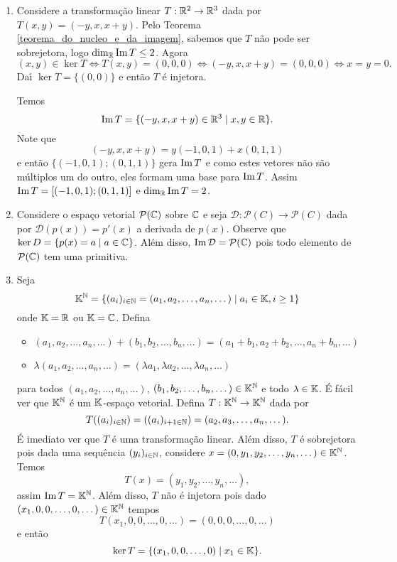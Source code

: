 \begin{exemplos}
	\begin{enumerate}
		\item Considere a transforma\c{c}\~ao linear $T : \mathbb{R}^2 \to \mathbb{R}^3$ dada por $T(x,y) = (-y, x, x+y)$. Pelo Teorema \ref{teorema_do_nucleo_e_da_imagem}, sabemos que $T$ n\~ao pode ser sobrejetora, logo $\dim_{\mathbb{R}}{\rm Im\,} T \le 2$. Agora
		\[
			(x,y) \in \ker T \Leftrightarrow T(x,y) = (0,0,0) \Leftrightarrow (-y,x,x+y) = (0,0,0) \Leftrightarrow x = y = 0.
		\]
		Da{\'\i} $\ker T = \{(0,0)\}$ e ent\~ao $T$ \'e injetora.

		Temos
		\[
			{\rm Im\,} T = \{(-y,x,x+y) \in \mathbb{R}^3 \mid x, y \in \mathbb{R}\}.
		\]
		Note que
		\[
			(-y,x,x+y) = y(-1,0,1) + x(0,1,1)
		\]
		e ent\~ao $\{(-1,0,1);(0,1,1)\}$ gera ${\rm Im\,} T$ e como estes vetores n\~ao s\~ao m\'ultiplos um do outro, eles formam uma base para ${\rm Im\,} T$. Assim ${\rm Im\,} T = [(-1,0,1);(0,1,1)]$ e $\dim_{\mathbb{R}}{\rm Im\,} T = 2$.

		\item Considere o espa\c{c}o vetorial $\mathcal{P}(\mathbb{C})$ sobre $\mathbb{C}$ e seja $\mathcal{D} : \mathcal{P}(C) \to \mathcal{P}(C)$ dada por $\mathcal{D}(p(x)) = p'(x)$ a derivada de $p(x)$. Observe que $\ker D = \{p(x) = a \mid a \in \mathbb{C}\}$. Al\'em disso, ${\rm Im\,} \mathcal{D} = \mathcal{P}(\mathbb{C})$ pois todo elemento de $\mathcal{P}(\mathbb{C})$ tem uma primitiva.

		\item Seja
		\[
			\mathbb{K}^{\mathbb{N}} = \{(a_i)_{i \in \mathbb{N}} = (a_1, a_2, \dots, a_n, \dots) \mid a_i \in \mathbb{K}, i \ge 1\}
		\]
		onde $\mathbb{K} = \mathbb{R}$ ou $\mathbb{K} = \mathbb{C}$. Defina
		\begin{itemize}
			\item $(a_1,a_2,\dots,a_n,\dots) + (b_1,b_2,\dots,b_n,\dots) = (a_1+b_1,a_2+b_2,\dots,a_n+b_n,\dots)$

			\item $\lambda(a_1,a_2,\dots,a_n,\dots) = (\lambda a_1,\lambda a_2,\dots,\lambda a_n,\dots)$
		\end{itemize}
		para todos $(a_1,a_2,\dots,a_n,\dots)$, $(b_1,b_2,\dots,b_n,\dots) \in \mathbb{K}^{\mathbb{N}}$ e todo $\lambda \in \mathbb{K}$. \'E f\'acil ver que $\mathbb{K}^{\mathbb{N}}$ \'e um $\mathbb{K}$-espa\c{c}o vetorial. Defina $T : \mathbb{K}^{\mathbb{N}} \to \mathbb{K}^{\mathbb{N}}$ dada por
		\[
			T((a_i)_{i\in\mathbb{N}}) = ((a_i)_{i+1\in\mathbb{N}}) = (a_2,a_3,\dots,a_n,\dots).
		\]
		\'E imediato ver que $T$ \'e uma transforma\c{c}\~ao linear. Al\'em disso, $T$ \'e sobrejetora pois dada uma sequ\^encia $(y_i)_{i\in\mathbb{N}}$, considere $x = (0,y_1,y_2,\dots,y_n,\dots) \in \mathbb{K}^{\mathbb{N}}$. Temos
		\[
			T(x) = (y_1,y_2,\dots,y_n,\dots),
		\]
		assim ${\rm Im\,} T = \mathbb{K}^{\mathbb{N}}$. Al\'em disso, $T$ n\~ao \'e injetora pois dado $(x_1,0,0,\dots,0,\dots) \in \mathbb{K}^{\mathbb{N}}$ tempos
		\[
			T(x_1,0,0,\dots,0,\dots) = (0,0,0,\dots,0,\dots)
		\]
		e ent\~ao
		\[
			\ker T = \{(x_1,0,0,\dots,0) \mid x_1 \in \mathbb{K}\}.
		\]
	\end{enumerate}
\end{exemplos}

